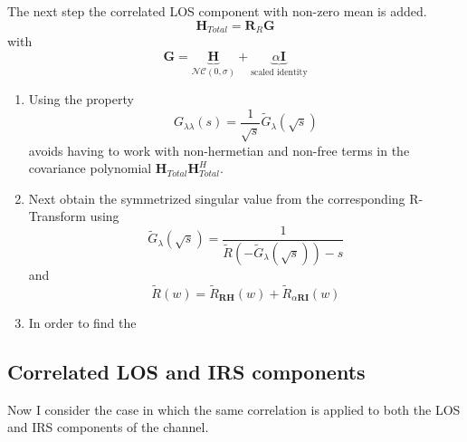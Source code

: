 \documentclass[12pt,a4paper]{report}
\begin{document}
The next step the correlated LOS component with non-zero mean is added. 
	\begin{equation}
	\mathbf{H}_{Total} = \mathbf{R}_{R}\mathbf{G}
	\end{equation}
	with 
	\begin{equation}
	\mathbf{G} = \underbrace{\mathbf{H}}_{\mathcal{NC}(0,\sigma)} + \underbrace{\alpha\mathbf{I}}_{\text{scaled identity}}
	\end{equation}
	\begin{enumerate}
	\item
	Using the property 
		\begin{equation}\label{svd_aed_property}
		G_{\lambda\lambda}(s) = \frac{1}{\sqrt{s}}\tilde{G}_{\lambda}(\sqrt{s})
		\end{equation}
	avoids having to work with non-hermetian and non-free terms in the covariance polynomial $\mathbf{H}_{Total}\mathbf{H}_{Total}^H$. 
	\item 
		Next obtain the symmetrized singular value from the corresponding R-Transform using
		\begin{equation}
		\tilde{G}_{\lambda}(\sqrt{s}) = \frac{1}{\tilde{R}(-\tilde{G}_{\lambda}(\sqrt{s})) - s}
		\end{equation}
		and 
			\begin{equation}
			\tilde{R}(w) = \tilde{R}_{\mathbf{R}\mathbf{H}}(w) + \tilde{R}_{\alpha\mathbf{R}\mathbf{I}}(w)
			\end{equation}
	\item 
		In order to find the 
	\end{enumerate}	


\subsection{Correlated LOS and IRS components}\label{ssection:los_correlated}
Now I consider the case in which the same correlation is applied to both the LOS and IRS components of the channel.	
\end{document}
